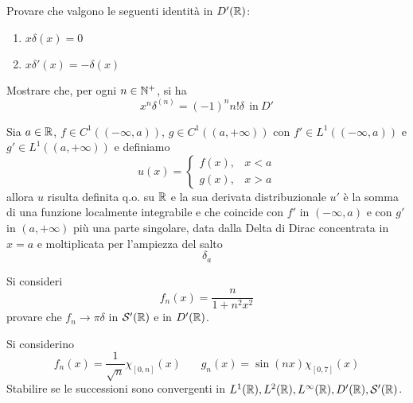 Provare che valgono le seguenti identità in $D'(\mathbb{R})$:
\begin{enumerate}
\item $x\delta (x) = 0$
\item $x\delta '(x) = - \delta (x)$
\end{enumerate}

Mostrare che, per ogni $n\in \mathbb{N}^{+}$, si ha
\begin{equation*}
\boxed{x^{n} \delta^{(n)} = (- 1)^{n} n!\delta \ \ \text{in} \ D'}
\end{equation*}

Sia $a\in \mathbb{R} $, $f\in C^{1}((- \infty, a))$, $g\in C^{1}((a, + \infty))$ con $f'\in L^{1}((- \infty, a))$ e $g'\in L^{1}((a, + \infty))$ e definiamo
\begin{equation*}
u(x) =
\begin{cases}
f(x), & x < a\\
g(x), & x > a
\end{cases}
\end{equation*}
allora $u$ risulta definita q.o. su $\mathbb{R} $ e la sua derivata distribuzionale $u'$ è la somma di una funzione localmente integrabile e che coincide con $f'$ in $(- \infty, a)$ e con $g'$ in $(a, + \infty)$ più una parte singolare, data dalla Delta di Dirac concentrata in $x = a$ e moltiplicata per l'ampiezza del salto
\begin{equation*}
[ u(a_{+}) - u(a_{-})] \delta_{a}
\end{equation*}
\Esercizio{}

Si consideri
\begin{equation*}
f_{n}(x) = \frac{n}{1 + n^{2} x^{2}}
\end{equation*}
provare che $f_{n}\rightarrow \pi \delta $ in $\mathcal{S} '(\mathbb{R})$ e in $D'(\mathbb{R})$.
\Esercizio{}

Si considerino
\begin{equation*}
f_{n}(x) = \frac{1}{\sqrt{n}} \chi_{[ 0, n]}(x) \ \ \ \ \ \ \ \ g_{n}(x) = \sin(nx) \chi_{[ 0, 7]}(x)
\end{equation*}
Stabilire se le successioni sono convergenti in $L^{1}(\mathbb{R}), L^{2}(\mathbb{R}), L^{\infty}(\mathbb{R}), D'(\mathbb{R}), \mathcal{S} '(\mathbb{R})$.
\Esercizio{}

